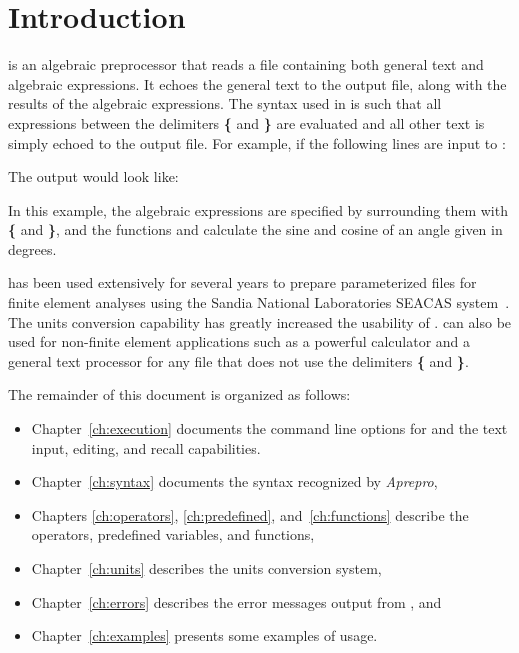 \chapter{Introduction}

\aprepro{} is an algebraic preprocessor that reads a file containing both
general text and algebraic expressions. It echoes the general text to the output
file, along with the results of the algebraic expressions. The syntax used in \aprepro{}
is such that all expressions between the delimiters \textbf{\{} and \textbf{\}}
are evaluated and all other text is simply echoed to the output file. For example,
if the following lines are input to \aprepro{}:


The output would look like:


In this example, the algebraic expressions are specified by surrounding them with
\textbf{\{} and \textbf{\}}, and the functions  and 
calculate the sine and cosine of an angle given in degrees.

\aprepro{} has been used extensively for several years to prepare parameterized
files for finite element analyses using the Sandia National Laboratories
SEACAS system~\cite{bib:seacas}. The units conversion capability has greatly increased the
usability of \aprepro{}. \aprepro{} can also be used for non-finite element
applications such as a powerful calculator and a general text processor for any
file that does not use the delimiters \textbf{\{} and \textbf{\}}.

The remainder of this document is organized as follows:

\begin{itemize}
\item Chapter~\ref{ch:execution} documents the command line options for \aprepro{} and the text input, editing, and recall capabilities.
\item Chapter~\ref{ch:syntax} documents the syntax recognized by \textit{Aprepro},
\item Chapters \ref{ch:operators}, \ref{ch:predefined}, and~\ref{ch:functions} describe the operators, predefined variables, and functions,
\item Chapter~\ref{ch:units} describes the units conversion system,
\item Chapter~\ref{ch:errors} describes the error messages output from \aprepro{}, and
\item Chapter~\ref{ch:examples} presents some examples of \aprepro{} usage.
\end{itemize}
